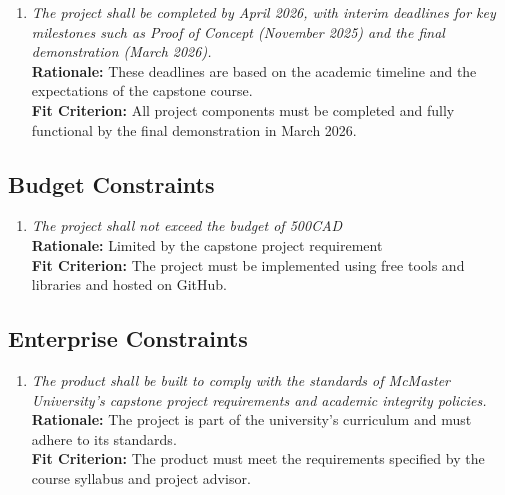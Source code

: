 \documentclass[12pt]{article}
\begin{document}
\begin{enumerate}[label=SCHD \arabic*., wide=0pt, leftmargin=*]
  \item \emph{The project shall be completed by April 2026, with
          interim deadlines for key milestones such as Proof of Concept
          (November 2025) and the final demonstration (March 2026).}\\[2mm]
        {\bf Rationale:} These deadlines are based on the academic
        timeline and the expectations of the capstone course.\\
        {\bf Fit Criterion:} All project components must be completed and
        fully functional by the final demonstration in March 2026.
\end{enumerate}

\subsection{Budget Constraints}

\begin{enumerate}[label=BDGT \arabic*., wide=0pt, leftmargin=*]
  \item \emph{The project shall not exceed the budget of 500CAD}\\[2mm]
        {\bf Rationale:} Limited by the capstone project requirement\\
        {\bf Fit Criterion:} The project must be implemented using free
        tools and libraries and hosted on GitHub.
\end{enumerate}

\subsection{Enterprise Constraints}

\begin{enumerate}[label=ENTP \arabic*., wide=0pt, leftmargin=*]
  \item \emph{The product shall be built to comply with the standards
          of McMaster University's capstone project requirements and
          academic integrity policies.}\\[2mm]
        {\bf Rationale:} The project is part of the university's
        curriculum and must adhere to its standards.\\
        {\bf Fit Criterion:} The product must meet the requirements
        specified by the course syllabus and project advisor.
\end{enumerate}
\end{document}
